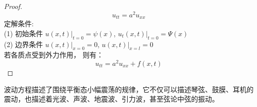 \begin{example}
\begin{proof}
\begin{equation*}
 u_{tt}=a^2u_{xx}
\end{equation*}
定解条件:\\
 (1) 初始条件 
	$\displaystyle  u(x,t)|_{t=0}= \psi (x) $, 	 $\displaystyle  u_t(x,t)|_{t=0}= \Psi (x) $\\
(2) 边界条件
	$\displaystyle  u(x,t)|_{x=0}= 0 $, 	 $\displaystyle  u(x,t)|_{x=l}= 0 $\\	\vspace{0.3cm} 
若各质点受到外力作用， 则有：
\begin{equation*}
	u_{tt}=a^2u_{xx} +f(x,t)
\end{equation*}
\end{proof}
\end{example}

\begin{note}
波动方程描述了围绕平衡态小幅震荡的规律，它不仅可以描述琴弦、鼓膜、耳机的震动，也描述着光波、声波、地震波、引力波，甚至弦论中弦的振动。
\end{note}

